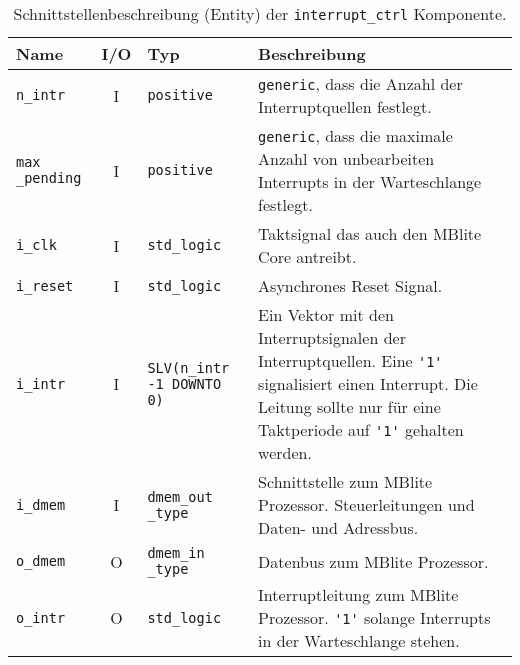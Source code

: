 \begin{table}[htbp]
    \ttabbox
    {
        \caption[Code Replika Generator Schnittstelle]{Schnittstellenbeschreibung (Entity) der \lstinline$interrupt_ctrl$ Komponente.}
        \label{TabIRQCtrl_Entity}
    }
    {
    \begin{tabular}{p{1.5cm} c  p{2cm} p{5.5cm}}
        \toprule
        Name                        & I/O       & Typ                       & Beschreibung \\
        \midrule
        \lstinline$n_intr$          & I         & \lstinline$positive$      & \lstinline$generic$, dass die Anzahl der Interruptquellen festlegt.\\
        \lstinline$max _pending$     & I         & \lstinline$positive$      & \lstinline$generic$, dass die maximale Anzahl von unbearbeiten Interrupts in der Warteschlange festlegt.\\
        \lstinline$i_clk$           & I         & \lstinline$std_logic$     & Taktsignal das auch den MBlite Core antreibt.\\
        \lstinline$i_reset$         & I         & \lstinline$std_logic$     & Asynchrones Reset Signal.\\
        \lstinline$i_intr$          & I         & \lstinline$SLV(n_intr -1 DOWNTO 0)$    & Ein Vektor mit den Interruptsignalen der Interruptquellen. Eine \lstinline$'1'$ signalisiert einen Interrupt. Die Leitung sollte nur für eine Taktperiode auf \lstinline$'1'$ gehalten werden.\\
        \lstinline$i_dmem$          & I         & \lstinline$dmem_out _type$            & Schnittstelle zum MBlite Prozessor. Steuerleitungen und Daten- und Adressbus.\\
        \lstinline$o_dmem$          & O	        & \lstinline$dmem_in _type$	& Datenbus zum MBlite Prozessor. \\
        \lstinline$o_intr$          & O         & \lstinline$std_logic$     & Interruptleitung zum MBlite Prozessor. \lstinline$'1'$ solange Interrupts in der Warteschlange stehen.\\
        \bottomrule
    \end{tabular}
}
\end{table}

